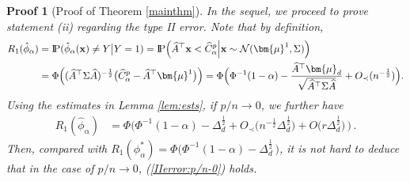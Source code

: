 \documentclass[12pt]{article}
\numberwithin{equation}{section}
\newtheorem{myPro}{Proof}
\theoremstyle{remark}
\newcommand{\p}{{\rm I}\kern-0.18em{\rm P}}
\newcommand{\1}{{\rm 1}\kern-0.24em{\rm I}}
\begin{document}
\begin{myPro} [Proof of  Theorem \ref{mainthm}]
{\color{black}
In the sequel, we proceed to prove statement (ii) regarding the type II error. Note that by definition,
\begin{align}\label{steps:mainthm1}
R_1(\hat{\phi}_\alpha) & = \p (\hat{\phi}_\alpha({\bf x})\neq Y\big|Y=1)
= \p \Big( \widehat A^{\top} {\bf x}< \widehat C_\alpha^p\Big| {\bf x}\sim \mathcal{N}({\bm{\mu}}^1, \Sigma)\Big) \notag\\
&= \Phi\Big(( \widehat A^{\top}\Sigma \widehat A )^{-\frac 12}\big (\widehat C_\alpha^p- \widehat A^{\top}{\bm{\mu}}^1\big)\Big)
= \Phi\Big( \Phi^{-1}(1-\alpha) -\frac{\widehat A^{\top}{\bm{\mu}}_d }{\sqrt{\widehat A^{\top}\Sigma \widehat A}} + O_\prec(n^{-\frac12}) \Big).
\end{align}
Using the estimates in Lemma \ref{lem:ests}, if $p/n\to 0$, we further have 
\begin{align*}
R_1(\hat{\phi}_\alpha) &=  \Phi\Big(\Phi^{-1}(1-\alpha) -\varDelta_d^{\frac 12}  + O_\prec\big(n^{-\frac12}\varDelta_d^{\frac 12} \big) + O\big(r\varDelta_d^{\frac 12} \big)\, \Big)\,.
\end{align*}
Then, compared with $R_1({\phi}_\alpha^*)= \Phi\Big(\Phi^{-1}(1-\alpha) - \varDelta_d^{\frac 12} \, \Big)$,
it is not hard to deduce that in the case of $p/n\to 0$, (\ref{IIerror:p/n-0}) holds.

}
\end{myPro}
\end{document}
